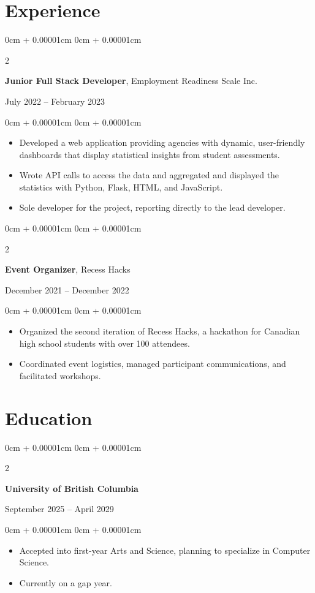 \documentclass[10pt, letterpaper]{article}
\newenvironment{highlights}{
    \begin{itemize}[
        topsep=0.10cm,
        parsep=0.10cm,
        partopsep=0pt,
        itemsep=0pt,
        leftmargin=0cm + 10pt
    ]
}{
    \end{itemize}
}
\newenvironment{onecolentry}{
    \begin{adjustwidth}{
        0cm + 0.00001cm
    }{
        0cm + 0.00001cm
    }
}{
    \end{adjustwidth}
}
\newenvironment{twocolentry}[2][]{
    \onecolentry
    \def\secondColumn{#2}
    \setcolumnwidth{\fill, 5.5 cm} %
    \begin{paracol}{2}
}{
    \switchcolumn \raggedleft \secondColumn
    \end{paracol}
    \endonecolentry
}
\begin{document}
    \section{Experience}
    \begin{twocolentry}{July 2022 – February 2023}
        \textbf{Junior Full Stack Developer}, Employment Readiness Scale Inc.
    \end{twocolentry}
    \vspace{0.10cm}
    \begin{onecolentry}
        \begin{highlights}
            \item Developed a web application providing agencies with dynamic, user-friendly dashboards that display statistical insights from student assessments.
            \item Wrote API calls to access the data and aggregated and displayed the statistics with Python, Flask, HTML, and JavaScript. 
            \item Sole developer for the project, reporting directly to the lead developer.
        \end{highlights}
    \end{onecolentry}

    \vspace{0.2cm}

    \begin{twocolentry}{December 2021 – December 2022}
        \textbf{Event Organizer}, Recess Hacks 
    \end{twocolentry}
    
    \vspace{0.10cm}
    \begin{onecolentry}
        \begin{highlights}
            \item Organized the second iteration of Recess Hacks, a hackathon for Canadian high school students with over 100 attendees.
            \item Coordinated event logistics, managed participant communications, and facilitated workshops.
        \end{highlights}
    \end{onecolentry}

    \section{Education}
    
    \begin{twocolentry}{September 2025 – April 2029}
        \textbf{University of British Columbia}
    \end{twocolentry}
    \vspace{0.10cm}
    \begin{onecolentry}
        \begin{highlights}
            \item Accepted into first-year Arts and Science, planning to specialize in Computer Science.
            \item Currently on a gap year.
        \end{highlights}
    \end{onecolentry}
\end{document}
